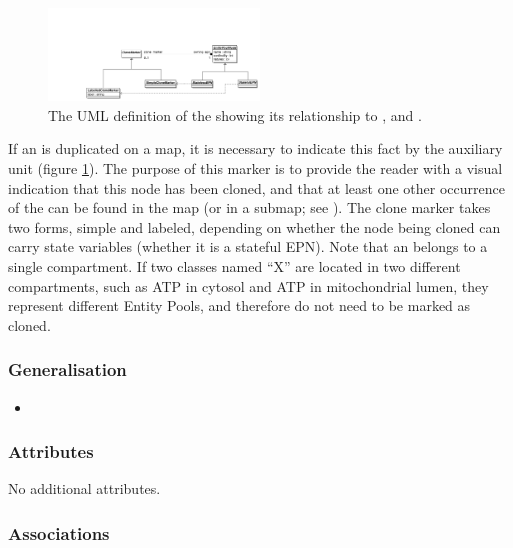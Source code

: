 \begin{figure}[htb]
  \centering
  \includegraphics[width = 0.5\textwidth]{images/clonemarkeruml}
  \caption{The UML definition of the  showing
    its relationship to , 
    and .}
  \label{fig:clonemarkeruml}
\end{figure}

If an  is duplicated on a map, it is
necessary to indicate this fact by the 
auxiliary unit (figure \ref{fig:clonemarkeruml}).  The purpose of this
marker is to provide the reader with a visual indication that this
node has been cloned, and that at least one other occurrence of the
 can be found in the map (or in a submap;
see ).  The clone marker takes two forms, simple and
labeled, depending on whether the node being cloned can carry state
variables (\ie whether it is a stateful EPN). Note that an
 belongs to a single compartment. If two
classes named ``X'' are located in two different compartments, such as
ATP in cytosol and ATP in mitochondrial lumen, they represent
different Entity Pools, and therefore do not need to be marked as
cloned.

\subsubsection{Generalisation}

\begin{itemize}
\item {}
\end{itemize}

\subsubsection{Attributes}

No additional attributes.

\subsubsection{Associations}

